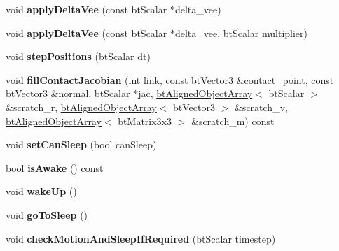 \begin{DoxyCompactItemize}
\item 
\hypertarget{classbt_multi_body_ad233408cb61f257b1c3977bf3b7bcd8e}{void {\bfseries apply\+Delta\+Vee} (const bt\+Scalar $\ast$delta\+\_\+vee)}\label{classbt_multi_body_ad233408cb61f257b1c3977bf3b7bcd8e}

\item 
\hypertarget{classbt_multi_body_aac7bf81725ac6ca493b03d264d06e663}{void {\bfseries apply\+Delta\+Vee} (const bt\+Scalar $\ast$delta\+\_\+vee, bt\+Scalar multiplier)}\label{classbt_multi_body_aac7bf81725ac6ca493b03d264d06e663}

\item 
\hypertarget{classbt_multi_body_a81d5daf2fe75d4f21149f2607002fe23}{void {\bfseries step\+Positions} (bt\+Scalar dt)}\label{classbt_multi_body_a81d5daf2fe75d4f21149f2607002fe23}

\item 
\hypertarget{classbt_multi_body_af299e8e99d7c78d73fb387b44e97ee06}{void {\bfseries fill\+Contact\+Jacobian} (int link, const bt\+Vector3 \&contact\+\_\+point, const bt\+Vector3 \&normal, bt\+Scalar $\ast$jac, \hyperlink{classbt_aligned_object_array}{bt\+Aligned\+Object\+Array}$<$ bt\+Scalar $>$ \&scratch\+\_\+r, \hyperlink{classbt_aligned_object_array}{bt\+Aligned\+Object\+Array}$<$ bt\+Vector3 $>$ \&scratch\+\_\+v, \hyperlink{classbt_aligned_object_array}{bt\+Aligned\+Object\+Array}$<$ bt\+Matrix3x3 $>$ \&scratch\+\_\+m) const }\label{classbt_multi_body_af299e8e99d7c78d73fb387b44e97ee06}

\item 
\hypertarget{classbt_multi_body_a2659acc78021df7907f0ac75e4e9ea61}{void {\bfseries set\+Can\+Sleep} (bool can\+Sleep)}\label{classbt_multi_body_a2659acc78021df7907f0ac75e4e9ea61}

\item 
\hypertarget{classbt_multi_body_a947ebf5106cd13a75d4ba57c5bd6f265}{bool {\bfseries is\+Awake} () const }\label{classbt_multi_body_a947ebf5106cd13a75d4ba57c5bd6f265}

\item 
\hypertarget{classbt_multi_body_a2cf38777cf487eafb13cdd5b56a0f530}{void {\bfseries wake\+Up} ()}\label{classbt_multi_body_a2cf38777cf487eafb13cdd5b56a0f530}

\item 
\hypertarget{classbt_multi_body_adc438609bb0c384950cfba1ee720200b}{void {\bfseries go\+To\+Sleep} ()}\label{classbt_multi_body_adc438609bb0c384950cfba1ee720200b}

\item 
\hypertarget{classbt_multi_body_a6fda2785db8302ce2e487cf55aff23d5}{void {\bfseries check\+Motion\+And\+Sleep\+If\+Required} (bt\+Scalar timestep)}\label{classbt_multi_body_a6fda2785db8302ce2e487cf55aff23d5}


\end{DoxyCompactItemize}
